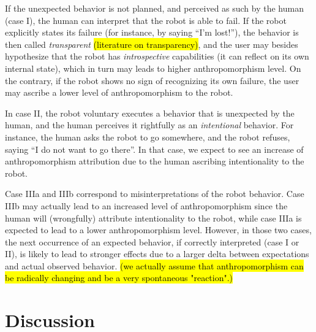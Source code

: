\documentclass{frontiersSCNS} %
\begin{document}
If the unexpected behavior is not planned, and perceived as such by the human
(case I), the human can interpret that the robot is able to fail. If the robot
explicitly states its failure (for instance, by saying ``I'm lost!''), the
behavior is then called \emph{transparent} 
\hl{(literature on transparency)}, and the user may besides hypothesize that the
robot has \emph{introspective} capabilities (it can reflect on its own internal
state), which in turn may leads to higher anthropomorphism level.  On the
contrary, if the robot shows no sign of recognizing its own failure, the user
may ascribe a lower level of anthropomorphism to the robot.

In case II, the robot voluntary executes a behavior that is unexpected by the
human, and the human perceives it rightfully as an \emph{intentional} behavior.
For instance, the human asks the robot to go somewhere, and the robot refuses,
saying ``I do not want to go there''. In that case, we expect to see an increase
of anthropomorphism attribution due to the human ascribing intentionality to the
robot.

Case IIIa and IIIb correspond to misinterpretations of the robot behavior. Case
IIIb may actually lead to an increased level of anthropomorphism since the human
will (wrongfully) attribute intentionality to the robot, while case IIIa is
expected to lead to a lower anthropomorphism level.  However, in those two
cases, the next occurrence of an expected behavior, if correctly interpreted
(case I or II), is likely to lead to stronger effects due to a larger delta
between expectations and actual observed behavior. \hl{(we actually assume that
anthropomorphism can be radically changing and be a very spontaneous
"reaction".)}



%
%
%
%
%
%


\section{Discussion}
\label{sec:discussion}
\end{document}
